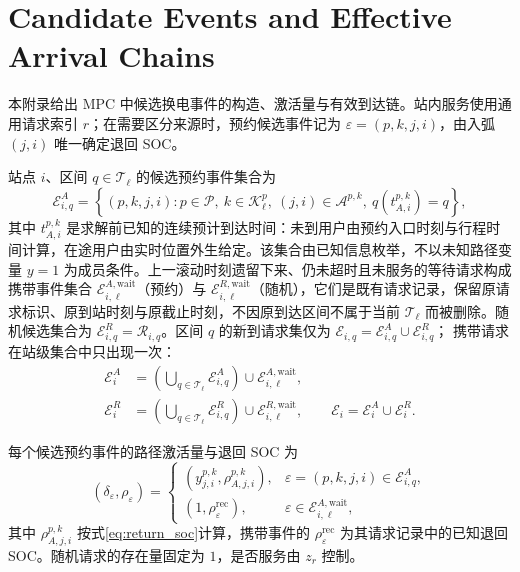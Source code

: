 \documentclass[12pt,a4paper,UTF8]{ctexart}
\begin{document}
\appendix

\section{Candidate Events and Effective Arrival Chains}
\label{app:events}

本附录给出 MPC 中候选换电事件的构造、激活量与有效到达链。站内服务使用通用请求索引 $r$；在需要区分来源时，预约候选事件记为 $\varepsilon=(p,k,j,i)$，由入弧 $(j,i)$ 唯一确定退回 SOC。

站点 $i$、区间 $q\in\mathcal T_\ell$ 的候选预约事件集合为
\begin{equation}
\mathcal E_{i,q}^{A}
=
\left\{(p,k,j,i):p\in\mathcal P,\ k\in\mathcal K_\ell^p,
\ (j,i)\in\mathcal A^{p,k},
\ q(t_{A,i}^{p,k})=q\right\},
\label{eq:swap_event_sets}
\end{equation}
其中 $t_{A,i}^{p,k}$ 是求解前已知的连续预计到达时间：未到用户由预约入口时刻与行程时间计算，在途用户由实时位置外生给定。该集合由已知信息枚举，不以未知路径变量 $y=1$ 为成员条件。上一滚动时刻遗留下来、仍未超时且未服务的等待请求构成携带事件集合 $\mathcal E_{i,\ell}^{A,\mathrm{wait}}$（预约）与 $\mathcal E_{i,\ell}^{R,\mathrm{wait}}$（随机），它们是既有请求记录，保留原请求标识、原到站时刻与原截止时刻，不因原到达区间不属于当前 $\mathcal T_\ell$ 而被删除。随机候选集合为 $\mathcal E_{i,q}^{R}=\mathcal R_{i,q}$。区间 $q$ 的新到请求集仅为
$\mathcal E_{i,q}=\mathcal E_{i,q}^{A}\cup\mathcal E_{i,q}^{R}$；
携带请求在站级集合中只出现一次：
\begin{equation}
\begin{aligned}
\mathcal E_i^A
&=\left(\bigcup_{q\in\mathcal T_\ell}\mathcal E_{i,q}^A\right)
\cup\mathcal E_{i,\ell}^{A,\mathrm{wait}},\\
\mathcal E_i^R
&=\left(\bigcup_{q\in\mathcal T_\ell}\mathcal E_{i,q}^R\right)
\cup\mathcal E_{i,\ell}^{R,\mathrm{wait}},
\qquad
\mathcal E_i=\mathcal E_i^A\cup\mathcal E_i^R.
\end{aligned}
\label{eq:station_event_union}
\end{equation}

每个候选预约事件的路径激活量与退回 SOC 为
\begin{equation}
(\delta_\varepsilon,\rho_\varepsilon)=
\begin{cases}
(y_{j,i}^{p,k},\rho_{A,j,i}^{p,k}),
&\varepsilon=(p,k,j,i)\in\mathcal E_{i,q}^{A},\\
(1,\rho_\varepsilon^{\mathrm{rec}}),
&\varepsilon\in\mathcal E_{i,\ell}^{A,\mathrm{wait}},
\end{cases}
\label{eq:event_activation_and_soc}
\end{equation}
其中 $\rho_{A,j,i}^{p,k}$ 按式\eqref{eq:return_soc}计算，携带事件的 $\rho_\varepsilon^{\mathrm{rec}}$ 为其请求记录中的已知退回 SOC。随机请求的存在量固定为 $1$，是否服务由 $z_r$ 控制。
\end{document}
